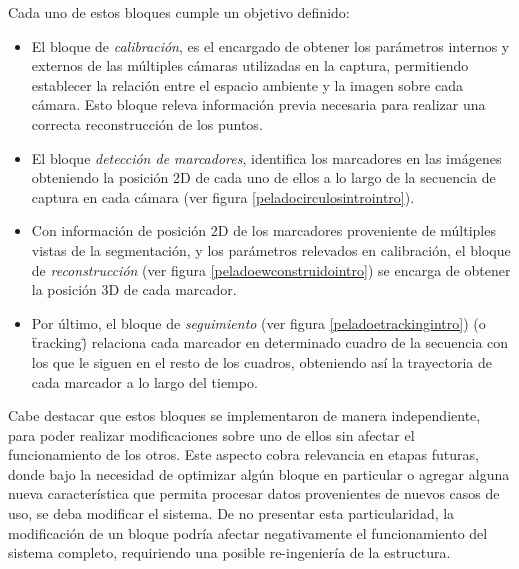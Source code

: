 Cada uno de estos bloques cumple un objetivo definido:
\begin{itemize}
\item El bloque de \emph{calibración}, es el encargado de obtener los parámetros internos y externos de las múltiples cámaras utilizadas en la captura, permitiendo establecer la relación entre el espacio ambiente y la imagen sobre cada cámara. Esto bloque releva información previa necesaria para realizar una correcta reconstrucción de los puntos.
\item El bloque \emph{detección de marcadores}, identifica los marcadores en las imágenes obteniendo la posición 2D de cada uno de ellos a lo largo de la secuencia de captura en cada cámara (ver figura \ref{peladocirculosintrointro}).
\item Con información de posición 2D de los marcadores proveniente de múltiples vistas de la segmentación, y los parámetros relevados en calibración, el bloque de \emph{reconstrucción} (ver figura \ref{peladoewconstruidointro}) se encarga de obtener la posición 3D de cada marcador.
\item Por último, el bloque de \emph{seguimiento} (ver figura \ref{peladoetrackingintro})
(o \"tracking\") relaciona cada marcador en determinado cuadro de la secuencia con los que le siguen en el resto de los cuadros, obteniendo así la trayectoria de cada marcador a lo largo del tiempo.
\end{itemize}

Cabe destacar que estos bloques se implementaron de manera independiente, para poder realizar modificaciones sobre uno de ellos sin afectar el funcionamiento de los otros. Este aspecto cobra relevancia en etapas futuras, donde bajo la necesidad de optimizar algún bloque en particular o agregar alguna nueva característica que permita procesar datos provenientes de nuevos casos de uso, se deba modificar el sistema. De no presentar esta particularidad, la modificación de un bloque podría afectar negativamente el funcionamiento del sistema completo, requiriendo una posible re-ingeniería de la estructura.

